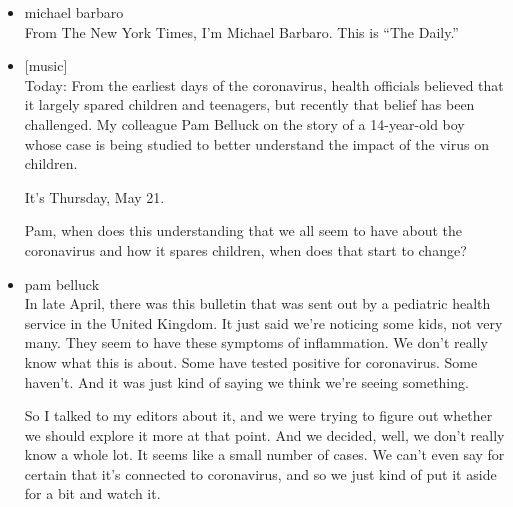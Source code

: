 \begin{itemize}
\item
  michael barbaro\\
  From The New York Times, I'm Michael Barbaro. This is ``The Daily.''
\item
  {[}music{]}\\
  Today: From the earliest days of the coronavirus, health officials
  believed that it largely spared children and teenagers, but recently
  that belief has been challenged. My colleague Pam Belluck on the story
  of a 14-year-old boy whose case is being studied to better understand
  the impact of the virus on children.

  It's Thursday, May 21.

  Pam, when does this understanding that we all seem to have about the
  coronavirus and how it spares children, when does that start to
  change?
\item
  pam belluck\\
  In late April, there was this bulletin that was sent out by a
  pediatric health service in the United Kingdom. It just said we're
  noticing some kids, not very many. They seem to have these symptoms of
  inflammation. We don't really know what this is about. Some have
  tested positive for coronavirus. Some haven't. And it was just kind of
  saying we think we're seeing something.

  So I talked to my editors about it, and we were trying to figure out
  whether we should explore it more at that point. And we decided, well,
  we don't really know a whole lot. It seems like a small number of
  cases. We can't even say for certain that it's connected to
  coronavirus, and so we just kind of put it aside for a bit and watch
  it.


\end{itemize}
